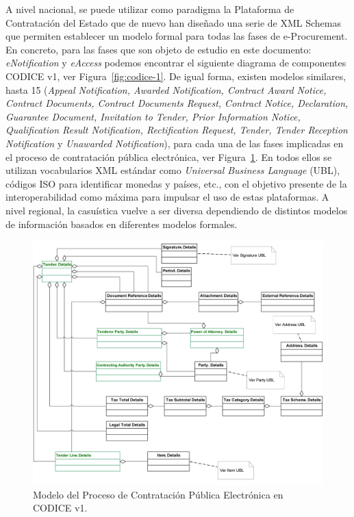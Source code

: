 A nivel nacional, se puede utilizar como paradigma la Plataforma de Contratación del Estado 
que de nuevo han diseñado una serie de XML Schemas que permiten establecer un modelo formal
para todas las fases de e-Procurement. En concreto, para las fases que son objeto
de estudio en este documento: \textit{eNotification} y \textit{eAccess} podemos
encontrar el siguiente diagrama de componentes \gls{CODICE} v1, ver Figura~\ref{fig:codice-1}. De igual
forma, existen modelos similares, hasta 15 (\textit{Appeal Notification, Awarded Notification, Contract Award Notice, Contract Documents, Contract Documents Request,
 Contract Notice, Declaration, Guarantee Document, Invitation to Tender, Prior Information Notice, Qualification Result Notification, 
Rectification Request, Tender, Tender Reception Notification} y \textit{Unawarded Notification}), para cada una de las fases implicadas en 
el proceso de contratación pública electrónica, ver Figura~\ref{fig:codice-3}. En todos ellos se utilizan 
vocabularios \gls{XML} estándar como \textit{Universal Business Language} (\gls{UBL}), códigos \gls{ISO} para identificar monedas y países, etc., 
con el objetivo presente de la interoperabilidad como máxima para impulsar el uso de estas
plataformas.  A nivel regional, la casuística vuelve a ser diversa dependiendo de distintos 
modelos de información basados en diferentes modelos formales.


%
\begin{figure}[!htb]
\centering
	\includegraphics[width=16cm]{images/phd/eproc/codice-3-tender}
\caption{Modelo del Proceso de Contratación Pública Electrónica en CODICE v1.}
\label{fig:codice-3}
\end{figure}

